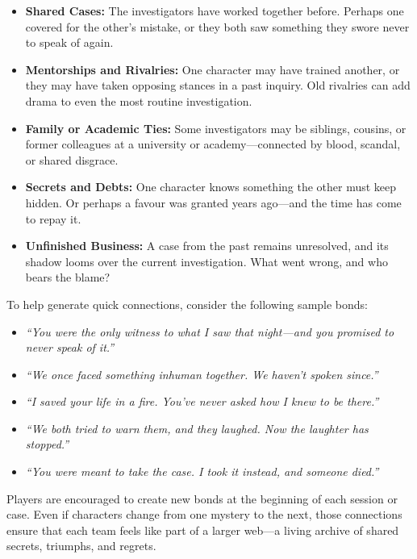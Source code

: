 \begin{itemize}
    \item \textbf{Shared Cases:} The investigators have worked together before. Perhaps one covered for the other's mistake, or they both saw something they swore never to speak of again.
    
    \item \textbf{Mentorships and Rivalries:} One character may have trained another, or they may have taken opposing stances in a past inquiry. Old rivalries can add drama to even the most routine investigation.
    
    \item \textbf{Family or Academic Ties:} Some investigators may be siblings, cousins, or former colleagues at a university or academy—connected by blood, scandal, or shared disgrace.
    
    \item \textbf{Secrets and Debts:} One character knows something the other must keep hidden. Or perhaps a favour was granted years ago—and the time has come to repay it.
    
    \item \textbf{Unfinished Business:} A case from the past remains unresolved, and its shadow looms over the current investigation. What went wrong, and who bears the blame?
\end{itemize}

To help generate quick connections, consider the following sample bonds:

\begin{itemize}
    \item \textit{“You were the only witness to what I saw that night—and you promised to never speak of it.”}
    \item \textit{“We once faced something inhuman together. We haven’t spoken since.”}
    \item \textit{“I saved your life in a fire. You’ve never asked how I knew to be there.”}
    \item \textit{“We both tried to warn them, and they laughed. Now the laughter has stopped.”}
    \item \textit{“You were meant to take the case. I took it instead, and someone died.”}
\end{itemize}

Players are encouraged to create new bonds at the beginning of each session or case. Even if characters change from one mystery to the next, those connections ensure that each team feels like part of a larger web—a living archive of shared secrets, triumphs, and regrets.

